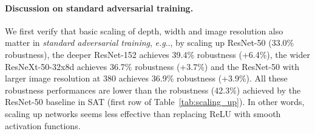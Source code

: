 \documentclass{article}
\makeatletter
\DeclareRobustCommand\onedot{\futurelet\@let@token\@onedot}
\def\@onedot{\ifx\@let@token.\else.\null\fi\xspace}
\def\eg{\emph{e.g}\onedot} \def\Eg{\emph{E.g}\onedot}
\makeatother
\begin{document}
\begin{table}[h!]
\centering
\vspace{-0.8em}
\caption{Scaling-up ResNet in SAT. We observe SAT consistently helps larger networks to get better performance.} 
\label{tab:scaling_up}
\vspace{-1.2em}
\end{table}



\paragraph{Discussion on standard adversarial training.} We first verify that basic scaling of depth, width and image resolution also matter in \emph{standard adversarial training}, \eg, by scaling up ResNet-50 (33.0\% robustness), the deeper ResNet-152 achieves 39.4\% robustness (+6.4\%), the wider ResNeXt-50-32x8d achieves 36.7\% robustness (+3.7\%) and the ResNet-50 with larger image resolution at 380 achieves 36.9\% robustness (+3.9\%). All these robustness performances are lower than the robustness (42.3\%) achieved by the ResNet-50 baseline in SAT (first row of Table~\ref{tab:scaling_up}). In other words, scaling up networks seems less effective than replacing ReLU with smooth activation functions. 
\end{document}
